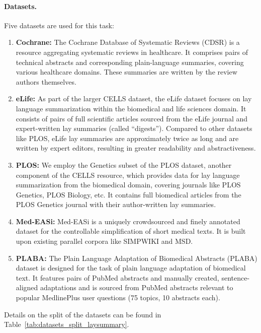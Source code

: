 \documentclass{article}
\begin{document}
\paragraph{Datasets.}
\label{sec:app_task2_datasets}
Five datasets are used for this task:
\begin{enumerate}
    \item\textbf{Cochrane:} The Cochrane Database of Systematic Reviews (CDSR) is a resource aggregating systematic reviews in healthcare. It comprises pairs of technical abstracts and corresponding plain-language summaries, covering various healthcare domains. These summaries are written by the review authors themselves.
    \item\textbf{eLife:} As part of the larger CELLS dataset, the eLife dataset focuses on lay language summarization within the biomedical and life sciences domain. It consists of pairs of full scientific articles sourced from the eLife journal and expert-written lay summaries (called ``digests''). Compared to other datasets like PLOS, eLife lay summaries are approximately twice as long and are written by expert editors, resulting in greater readability and abstractiveness.
    \item\textbf{PLOS:} We employ the Genetics subset of the PLOS dataset, another component of the CELLS resource, which provides data for lay language summarization from the biomedical domain, covering journals like PLOS Genetics, PLOS Biology, etc. It contains full biomedical articles from the PLOS Genetics journal with their author-written lay summaries.
    \item\textbf{Med-EASi:} Med-EASi is a uniquely crowdsourced and finely annotated dataset for the controllable simplification of short medical texts. It is built upon existing parallel corpora like SIMPWIKI and MSD.
    \item\textbf{PLABA:} The Plain Language Adaptation of Biomedical Abstracts (PLABA) dataset is designed for the task of plain language adaptation of biomedical text. It features pairs of PubMed abstracts and manually created, sentence-aligned adaptations and is sourced from PubMed abstracts relevant to popular MedlinePlus user questions (75 topics, 10 abstracts each).
\end{enumerate}
Details on the split of the datasets can be found in Table~\ref{tab:datasets_split_laysummary}.
\end{document}
